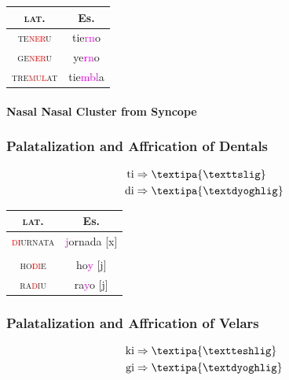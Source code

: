 \documentclass{report}[12pt]
\begin{document}
\begin{center}
\begin{tabular}{c c}
  \textsc{lat.} & Es. \\
  \hline
  \textsc{te\textcolor{red}{ner}u} & tie\textcolor{magenta}{rn}o \\
  \textsc{ge\textcolor{red}{ner}u} & ye\textcolor{magenta}{rn}o \\
  \textsc{tre\textcolor{red}{mul}at} & tie\textcolor{magenta}{mbl}a \\
\end{tabular}
\end{center}

\paragraph*{Nasal Nasal Cluster from Syncope}

\subsubsection*{Palatalization and Affrication of Dentals}

\begin{tcolorbox}
  \begin{align*}
    \text{ti} & \Rightarrow \text{\textipa{\texttslig}} \\
    \text{di} & \Rightarrow \text{\textipa{\textdyoghlig}} \\
  \end{align*}
\end{tcolorbox}

\begin{tabular}{c c}
  \textsc{lat.} & Es. \\
  \hline
  \textsc{\textcolor{red}{di}urnata} & \textcolor{magenta}{j}ornada [x] \\
                & \\
  \textsc{ho\textcolor{red}{di}e} & ho\textcolor{magenta}{y} [j] \\
  \textsc{ra\textcolor{red}{di}u} & ra\textcolor{magenta}{y}o [j] \\
\end{tabular}

\subsubsection*{Palatalization and Affrication of Velars}

\begin{tcolorbox}
  \begin{align*}
    \text{ki} & \Rightarrow \text{\textipa{\textteshlig}} \\
    \text{gi} & \Rightarrow \text{\textipa{\textdyoghlig}} \\
  \end{align*}
\end{tcolorbox}
\end{document}
